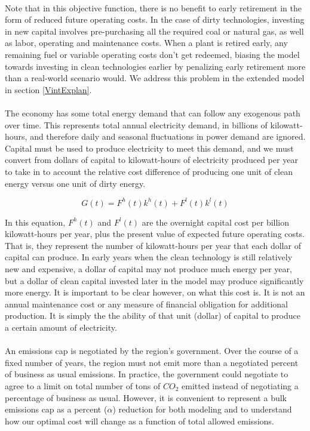\documentclass{article}
\begin{document}
\paragraph{} Note that in this objective function, there is no benefit to early retirement in the form of reduced future operating costs. In the case of dirty technologies, investing in new capital involves pre-purchasing all the required coal or natural gas, as well as labor, operating and maintenance costs. When a plant is retired early, any remaining fuel or variable operating costs don't get redeemed, biasing the model towards investing in clean technologies earlier by penalizing early retirement more than a real-world scenario would. We address this problem in the extended model in section \ref{VintExplan}.


\paragraph{} The economy has some total energy demand that can follow any exogenous path over time. This represents total annual electricity demand, in billions of kilowatt-hours, and therefore daily and seasonal fluctuations in power demand are ignored. Capital must be used to produce electricity to meet this demand, and we must convert from dollars of capital to kilowatt-hours of electricity produced per year to take in to account the relative cost difference of producing one unit of clean energy versus one unit of dirty energy. 

\begin{equation}\label{eq:simpleGenConstraint}
G(t) = F^h(t) k^h(t) + F^l(t) k^l(t)
\end{equation}

In this equation, $F^h (t)$ and $F^l (t)$ are the overnight capital cost per billion kilowatt-hours per year, plus the present value of expected future operating costs. That is, they represent the number of kilowatt-hours per year that each dollar of capital can produce. In early years when the clean technology is still relatively new and expensive, a dollar of capital may not produce much energy per year, but a dollar of clean capital invested later in the model may produce significantly more energy. It is important to be clear however, on what this cost is. It is not an annual maintenance cost or any measure of financial obligation for additional production. It is simply the the ability of that unit (dollar) of capital to produce a certain amount of electricity. 


\paragraph{} An emissions cap is negotiated by the region's government. Over the course of a fixed number of years, the region must not emit more than a negotiated percent of business as usual emissions. In practice, the government could negotiate to agree to a limit on total number of tons of $CO_2$ emitted instead of negotiating a percentage of business as usual. However, it is convenient to represent a bulk emissions cap as a percent ($\alpha$) reduction for both modeling and to understand how our optimal cost will change as a function of total allowed emissions.
\end{document}
